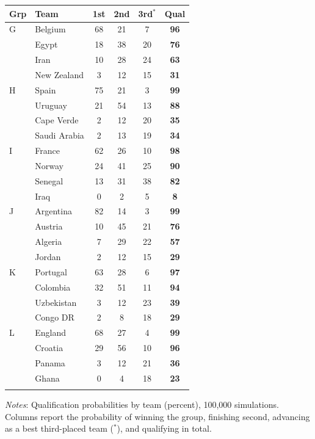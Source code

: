\documentclass[11pt,letterpaper]{article}
\begin{document}
\begin{table}[!t]
\begin{threeparttable}
{\begin{minipage}{0.49\textwidth}
\end{minipage}\hfill
\begin{minipage}{0.49\textwidth}\centering
\begin{tabular}{llcccc}
\toprule
Grp & Team & 1st & 2nd & 3rd$^{*}$ & Qual \\
\midrule
G & Belgium & 68 & 21 & 7 & \textbf{96} \\
 & Egypt & 18 & 38 & 20 & \textbf{76} \\
 & Iran & 10 & 28 & 24 & \textbf{63} \\
 & New Zealand & 3 & 12 & 15 & \textbf{31} \\
\addlinespace
H & Spain & 75 & 21 & 3 & \textbf{99} \\
 & Uruguay & 21 & 54 & 13 & \textbf{88} \\
 & Cape Verde & 2 & 12 & 20 & \textbf{35} \\
 & Saudi Arabia & 2 & 13 & 19 & \textbf{34} \\
\addlinespace
I & France & 62 & 26 & 10 & \textbf{98} \\
 & Norway & 24 & 41 & 25 & \textbf{90} \\
 & Senegal & 13 & 31 & 38 & \textbf{82} \\
 & Iraq & 0 & 2 & 5 & \textbf{8} \\
\addlinespace
J & Argentina & 82 & 14 & 3 & \textbf{99} \\
 & Austria & 10 & 45 & 21 & \textbf{76} \\
 & Algeria & 7 & 29 & 22 & \textbf{57} \\
 & Jordan & 2 & 12 & 15 & \textbf{29} \\
\addlinespace
K & Portugal & 63 & 28 & 6 & \textbf{97} \\
 & Colombia & 32 & 51 & 11 & \textbf{94} \\
 & Uzbekistan & 3 & 12 & 23 & \textbf{39} \\
 & Congo DR & 2 & 8 & 18 & \textbf{29} \\
\addlinespace
L & England & 68 & 27 & 4 & \textbf{99} \\
 & Croatia & 29 & 56 & 10 & \textbf{96} \\
 & Panama & 3 & 12 & 21 & \textbf{36} \\
 & Ghana & 0 & 4 & 18 & \textbf{23} \\
\addlinespace
\bottomrule
\end{tabular}
\end{minipage}}
    \begin{tablenotes}\notesize
      \item \textit{Notes}: Qualification probabilities by team (percent), 100{,}000 simulations. Columns report the probability of winning the group, finishing second, advancing as a best third-placed team ($^{*}$), and qualifying in total.
    \end{tablenotes}
  \end{threeparttable}
\end{table}
\end{document}
